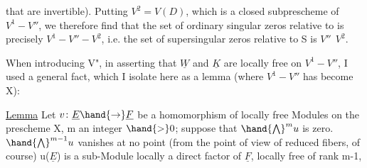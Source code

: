 
that are invertible). Putting $V^2 = V(D)$, which is a closed subprescheme of
$V^1-V''$, we therefore find that the set of  ordinary singular
zeros relative to  is precisely $V^1 - V'' - V^2$, i.e. the set of
supersingular zeros  relative to S is $V''\ \ V^2$.

 When introducing V", in asserting that $\underline{W}$ and $\underline{K}$ are
locally free on $V^1-V''$, I used a general fact, which I isolate
here as a lemma (where $V^1-V''$ has become X):

\uline{Lemma} Let $v\colon \underline{E} \hand{\to} \underline{F}$ be a homomorphism of locally free Modules
on the prescheme X,  m an integer $\hand{>}0$; suppose that $\hand{\bigwedge}^{m} u$ is
zero.  
$\hand{\bigwedge}^{m-1} u$ vanishes at no point (from the point of view of reduced fibers, of
course)   u($\underline{E}$) is a sub-Module locally a direct factor of $\underline{F}$,
locally free of rank m-1, 

